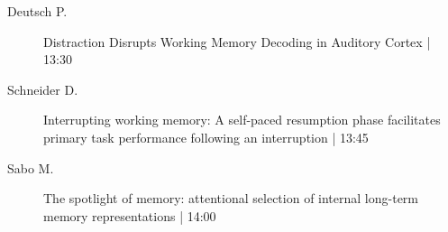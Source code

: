 \begin{symposium}
\begin{description}
                \item [ Deutsch P.] Distraction Disrupts Working Memory Decoding in Auditory Cortex \textcolor{mygray}{ | 13:30}    
                
                \item [ Schneider D.] Interrupting working memory: A self-paced resumption phase facilitates primary task performance following an interruption \textcolor{mygray}{ | 13:45}    
                
                \item [ Sabo M.] The spotlight of memory: attentional selection of internal long-term memory representations \textcolor{mygray}{ | 14:00}    
                
            \end{description} 
            \end{symposium}
            